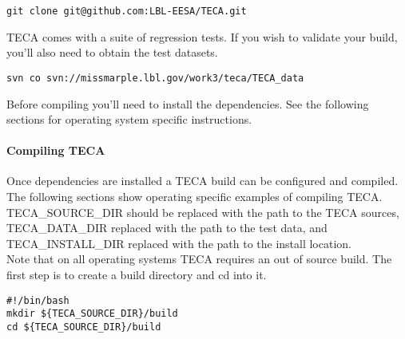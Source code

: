 \documentclass[a4paper,10pt,DIV=12]{scrreprt}
\begin{document}
\vspace{2mm}\hspace{0.2in}\begin{minipage}{0.8\textwidth}
\begin{verbatim}
git clone git@github.com:LBL-EESA/TECA.git
\end{verbatim}
\end{minipage}\vspace{2mm}

\noindent TECA comes with a suite of regression tests. If you wish to validate your build,
you'll also need to obtain the test datasets.

\vspace{2mm}\hspace{0.2in}\begin{minipage}{0.8\textwidth}
\begin{verbatim}
svn co svn://missmarple.lbl.gov/work3/teca/TECA_data
\end{verbatim}
\end{minipage}\vspace{2mm}

\noindent Before compiling you'll need to install the dependencies. See the following sections
for operating system specific instructions.

\paragraph{Compiling TECA} Once dependencies are installed a TECA build can be configured and compiled. The
following sections show operating specific examples of compiling TECA.
TECA\_SOURCE\_DIR should be replaced with the path to the TECA sources,
TECA\_DATA\_DIR replaced with the path to the test data, and TECA\_INSTALL\_DIR
replaced with the path to the install location. \\

\noindent Note that on all operating systems TECA requires an out of source build. The first step is
to create a build directory and cd into it.

\vspace{2mm}\hspace{0.2in}\begin{minipage}{0.8\textwidth}
\begin{verbatim}
#!/bin/bash
mkdir ${TECA_SOURCE_DIR}/build
cd ${TECA_SOURCE_DIR}/build
\end{verbatim}
\end{minipage}\vspace{2mm}
\end{document}
